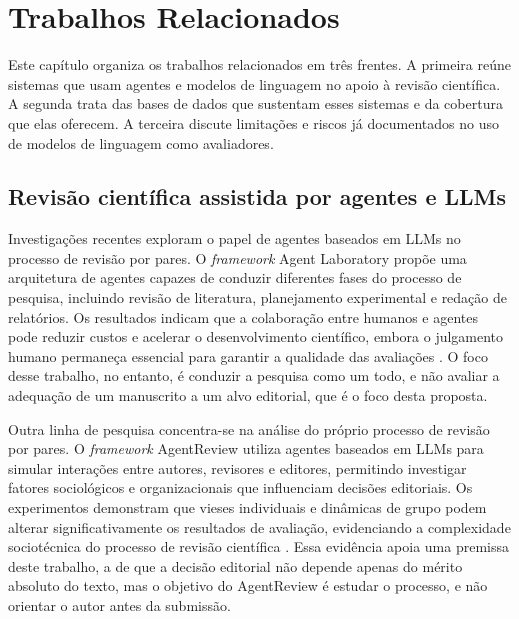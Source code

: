 \chapter{Trabalhos Relacionados}\label{chap:trabalhos_relacionados}

Este capítulo organiza os trabalhos relacionados em três frentes. A primeira reúne sistemas que usam agentes e modelos de linguagem no apoio à revisão científica. A segunda trata das bases de dados que sustentam esses sistemas e da cobertura que elas oferecem. A terceira discute limitações e riscos já documentados no uso de modelos de linguagem como avaliadores.

\section{Revisão científica assistida por agentes e LLMs}

Investigações recentes exploram o papel de agentes baseados em LLMs no processo de revisão por pares. O \textit{framework} Agent Laboratory propõe uma arquitetura de agentes capazes de conduzir diferentes fases do processo de pesquisa, incluindo revisão de literatura, planejamento experimental e redação de relatórios. Os resultados indicam que a colaboração entre humanos e agentes pode reduzir custos e acelerar o desenvolvimento científico, embora o julgamento humano permaneça essencial para garantir a qualidade das avaliações \cite{AgentLaboratory}. O foco desse trabalho, no entanto, é conduzir a pesquisa como um todo, e não avaliar a adequação de um manuscrito a um alvo editorial, que é o foco desta proposta.

Outra linha de pesquisa concentra-se na análise do próprio processo de revisão por pares. O \textit{framework} AgentReview utiliza agentes baseados em LLMs para simular interações entre autores, revisores e editores, permitindo investigar fatores sociológicos e organizacionais que influenciam decisões editoriais. Os experimentos demonstram que vieses individuais e dinâmicas de grupo podem alterar significativamente os resultados de avaliação, evidenciando a complexidade sociotécnica do processo de revisão científica \cite{AgentReview}. Essa evidência apoia uma premissa deste trabalho, a de que a decisão editorial não depende apenas do mérito absoluto do texto, mas o objetivo do AgentReview é estudar o processo, e não orientar o autor antes da submissão.

